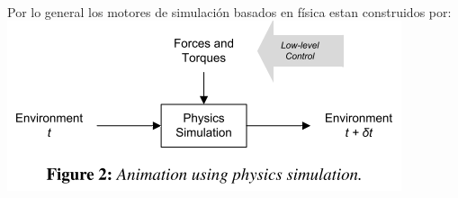 \documentclass[10pt,onecolumn,twoside,letterpaper]{article}
\begin{document}
\href{run:/home/jackmaster/Downloads/[2012 T Geijtenbeek and N Pronost] Art Interactive Character Animation Using Simulated Physics:
A State-of-the-Art Review.pdf}{
}\cite{Geijtenbeek2012}\\
Por lo general los motores de simulaci\'on basados en f\'isica estan construidos por:\\
\includegraphics[scale=0.4]{../../images/PhysicsSimulation.png}
\end{document}
